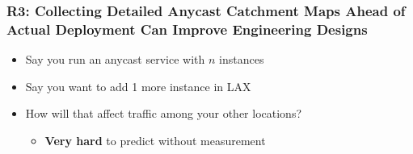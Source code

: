 \documentclass[11pt,show 
notes,notheorems,noamsthm,blank]{beamer} %
\begin{document}
\begin{frame}
 \frametitle{R3: Collecting Detailed Anycast Catchment Maps Ahead of Actual
    Deployment Can Improve Engineering Designs}
    
    \begin{itemize}
     \item Say you run an anycast service with $n$  instances
     \item  Say you want to add 1 more  instance in LAX
     \item How will that affect traffic among your other locations?
      \begin{itemize}
       \item \textbf{Very hard} to predict without measurement
      \end{itemize}

    \end{itemize}

    
\end{frame}
\end{document}
